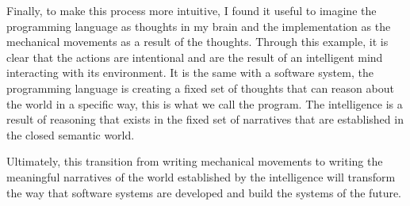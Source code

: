 Finally, to make this process more intuitive, I found it useful to imagine the programming language as thoughts in my brain and the implementation as the mechanical movements as a result of the thoughts. Through this example, it is clear that the actions are intentional and are the result of an intelligent mind interacting with its environment. It is the same with a software system, the programming language is creating a fixed set of thoughts that can reason about the world in a specific way, this is what we call the program. The intelligence is a result of reasoning that exists in the fixed set of narratives that are established in the closed semantic world.

Ultimately, this transition from writing mechanical movements to writing the meaningful narratives of the world established by the intelligence will transform the way that software systems are developed and build the systems of the future.


